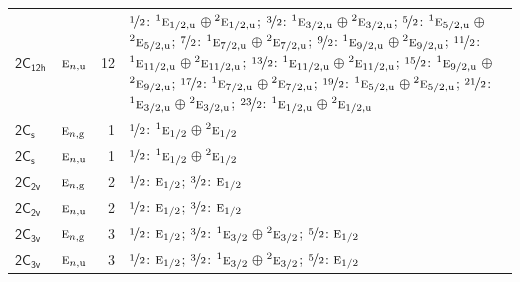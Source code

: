 \documentclass[10pt,a4paper]{article}
\numberwithin{equation}{section}
\newcommand{\grp}[1]{\mathsf{#1}}
\newcommand{\irr}[1]{\text{\normalfont\scshape #1}}
\newcommand{\conjpair}[1]{{}^{#1}}
\newcommand{\ptag}[1]{\mathrm{#1}}
\newlength{\fillwidth}\newlength{\cellwidth}\newlength{\colwidth}
\begin{document}
{\begin{longtable}{@{}llr>{\RaggedRight\arraybackslash}p{\fillwidth}@{}}
\href{2C12h.pdf}{$\grp{2C_{12h}}$} & $\irr{e}_{n,\ptag{u}}$ & 12 & $\nicefrac{1}{2}$: $\conjpair{1}\irr{e}_{1/2,\ptag{u}}$${}\oplus{}$$\conjpair{2}\irr{e}_{1/2,\ptag{u}}$; $\nicefrac{3}{2}$: $\conjpair{1}\irr{e}_{3/2,\ptag{u}}$${}\oplus{}$$\conjpair{2}\irr{e}_{3/2,\ptag{u}}$; $\nicefrac{5}{2}$: $\conjpair{1}\irr{e}_{5/2,\ptag{u}}$${}\oplus{}$$\conjpair{2}\irr{e}_{5/2,\ptag{u}}$; $\nicefrac{7}{2}$: $\conjpair{1}\irr{e}_{7/2,\ptag{u}}$${}\oplus{}$$\conjpair{2}\irr{e}_{7/2,\ptag{u}}$; $\nicefrac{9}{2}$: $\conjpair{1}\irr{e}_{9/2,\ptag{u}}$${}\oplus{}$$\conjpair{2}\irr{e}_{9/2,\ptag{u}}$; $\nicefrac{11}{2}$: $\conjpair{1}\irr{e}_{11/2,\ptag{u}}$${}\oplus{}$$\conjpair{2}\irr{e}_{11/2,\ptag{u}}$; $\nicefrac{13}{2}$: $\conjpair{1}\irr{e}_{11/2,\ptag{u}}$${}\oplus{}$$\conjpair{2}\irr{e}_{11/2,\ptag{u}}$; $\nicefrac{15}{2}$: $\conjpair{1}\irr{e}_{9/2,\ptag{u}}$${}\oplus{}$$\conjpair{2}\irr{e}_{9/2,\ptag{u}}$; $\nicefrac{17}{2}$: $\conjpair{1}\irr{e}_{7/2,\ptag{u}}$${}\oplus{}$$\conjpair{2}\irr{e}_{7/2,\ptag{u}}$; $\nicefrac{19}{2}$: $\conjpair{1}\irr{e}_{5/2,\ptag{u}}$${}\oplus{}$$\conjpair{2}\irr{e}_{5/2,\ptag{u}}$; $\nicefrac{21}{2}$: $\conjpair{1}\irr{e}_{3/2,\ptag{u}}$${}\oplus{}$$\conjpair{2}\irr{e}_{3/2,\ptag{u}}$; $\nicefrac{23}{2}$: $\conjpair{1}\irr{e}_{1/2,\ptag{u}}$${}\oplus{}$$\conjpair{2}\irr{e}_{1/2,\ptag{u}}$\\
\href{2C1v.pdf}{$\grp{2C_{s}}$} & $\irr{e}_{n,\ptag{g}}$ & 1 & $\nicefrac{1}{2}$: $\conjpair{1}\irr{e}_{1/2}$${}\oplus{}$$\conjpair{2}\irr{e}_{1/2}$\\
\href{2C1v.pdf}{$\grp{2C_{s}}$} & $\irr{e}_{n,\ptag{u}}$ & 1 & $\nicefrac{1}{2}$: $\conjpair{1}\irr{e}_{1/2}$${}\oplus{}$$\conjpair{2}\irr{e}_{1/2}$\\
\href{2C2v.pdf}{$\grp{2C_{2v}}$} & $\irr{e}_{n,\ptag{g}}$ & 2 & $\nicefrac{1}{2}$: $\irr{e}_{1/2}$; $\nicefrac{3}{2}$: $\irr{e}_{1/2}$\\
\href{2C2v.pdf}{$\grp{2C_{2v}}$} & $\irr{e}_{n,\ptag{u}}$ & 2 & $\nicefrac{1}{2}$: $\irr{e}_{1/2}$; $\nicefrac{3}{2}$: $\irr{e}_{1/2}$\\
\href{2C3v.pdf}{$\grp{2C_{3v}}$} & $\irr{e}_{n,\ptag{g}}$ & 3 & $\nicefrac{1}{2}$: $\irr{e}_{1/2}$; $\nicefrac{3}{2}$: $\conjpair{1}\irr{e}_{3/2}$${}\oplus{}$$\conjpair{2}\irr{e}_{3/2}$; $\nicefrac{5}{2}$: $\irr{e}_{1/2}$\\
\href{2C3v.pdf}{$\grp{2C_{3v}}$} & $\irr{e}_{n,\ptag{u}}$ & 3 & $\nicefrac{1}{2}$: $\irr{e}_{1/2}$; $\nicefrac{3}{2}$: $\conjpair{1}\irr{e}_{3/2}$${}\oplus{}$$\conjpair{2}\irr{e}_{3/2}$; $\nicefrac{5}{2}$: $\irr{e}_{1/2}$\\

\end{longtable}}
\end{document}
